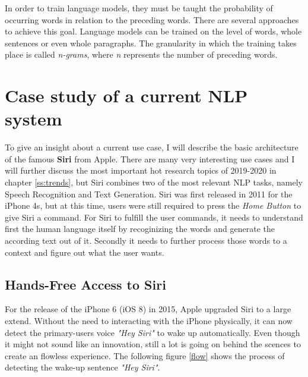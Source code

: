 In order to train language models, they must be taught the probability of occurring words in relation to the preceding words. There are several approaches to achieve this goal. Language models can be trained on the level of words, whole sentences or even whole paragraphs. The granularity in which the training takes place is called \textit{n-grams}, where \textit{n} represents the number of preceding words.

\section{Case study of a current NLP system}

To give an insight about a current use case, I will describe the basic architecture of the famous \textbf{Siri} from Apple. There are many very interesting use cases and I will further discuss the most important hot research topics of 2019-2020 in chapter \ref{ss:trends}, but Siri combines two of the most relevant NLP tasks, namely Speech Recognition and Text Generation. Siri was first released in 2011 for the iPhone 4s, but at this time, users were still required to press the \textit{Home Button} to give Siri a command. For Siri to fulfill the user commands, it needs to understand first the human language itself by recoginizing the words and generate the according text out of it. Secondly it needs to further process those words to a context and figure out what the user wants. 

\subsection{Hands-Free Access to Siri}
For the release of the iPhone 6 (iOS 8) in 2015, Apple upgraded Siri to a large extend. Without the need to interacting with the iPhone physically, it can now detect the primary-users voice \textit{"Hey Siri"} to wake up automatically. Even though it might not sound like an innovation, still a lot is going on behind the scences to create an flowless experience. The following figure \ref{flow} \cite{siri1} shows the process of detecting the wake-up sentence \textit{"Hey Siri"}.


